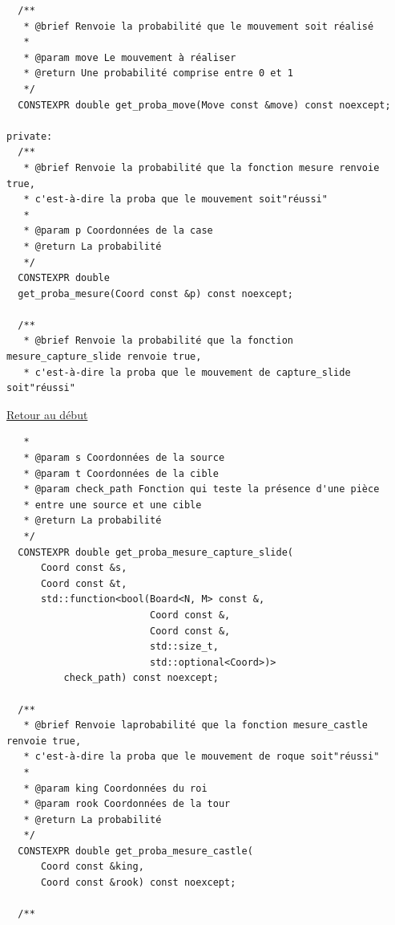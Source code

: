 {\begin{frame}[fragile]
\begin{verbatim}
  /**
   * @brief Renvoie la probabilité que le mouvement soit réalisé
   *
   * @param move Le mouvement à réaliser
   * @return Une probabilité comprise entre 0 et 1
   */
  CONSTEXPR double get_proba_move(Move const &move) const noexcept;

private:
  /**
   * @brief Renvoie la probabilité que la fonction mesure renvoie true,
   * c'est-à-dire la proba que le mouvement soit"réussi"
   *
   * @param p Coordonnées de la case
   * @return La probabilité
   */
  CONSTEXPR double
  get_proba_mesure(Coord const &p) const noexcept;

  /**
   * @brief Renvoie la probabilité que la fonction mesure_capture_slide renvoie true,
   * c'est-à-dire la proba que le mouvement de capture_slide soit"réussi"
\end{verbatim}
\end{frame}

\begin{frame}[fragile]
\hyperlink{conclusion}{Retour au début}\newline
\begin{verbatim}
   *
   * @param s Coordonnées de la source
   * @param t Coordonnées de la cible
   * @param check_path Fonction qui teste la présence d'une pièce
   * entre une source et une cible
   * @return La probabilité
   */
  CONSTEXPR double get_proba_mesure_capture_slide(
      Coord const &s,
      Coord const &t,
      std::function<bool(Board<N, M> const &,
                         Coord const &,
                         Coord const &,
                         std::size_t,
                         std::optional<Coord>)>
          check_path) const noexcept;

  /**
   * @brief Renvoie laprobabilité que la fonction mesure_castle renvoie true,
   * c'est-à-dire la proba que le mouvement de roque soit"réussi"
   *
   * @param king Coordonnées du roi
   * @param rook Coordonnées de la tour
   * @return La probabilité
   */
  CONSTEXPR double get_proba_mesure_castle(
      Coord const &king,
      Coord const &rook) const noexcept;

  /**
\end{verbatim}
\end{frame}

}
